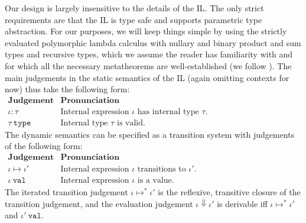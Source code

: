 

Our design is largely insensitive to the details of the IL. The only strict requirements are that the IL is type safe and supports parametric type abstraction. For our purposes, we will keep things simple by using the strictly evaluated polymorphic lambda calculus with nullary and binary product and sum types and recursive types, which we assume the reader has familiarity with and for which all the necessary metatheorems are well-established (we follow \cite{pfpl}). The main judgements in the static semantics of the IL (again omitting contexts for now) thus take the following form:
\\[1ex]
$
\begin{array}{ll}
\textbf{Judgement} & \textbf{Pronunciation}\\
\iota : \tau & \text{Internal expression $\iota$ has internal type $\tau$.}\\
\tau~\mathtt{type} & \text{Internal type $\tau$ is valid.}
\end{array}
$\\

\noindent
The dynamic semantics can be specified as a transition system with  judgements of the following form:
\\[1ex]
$
\begin{array}{ll}
\textbf{Judgement} & \textbf{Pronunciation}\\
\iota \mapsto \iota' & \text{Internal expression $\iota$ transitions to $\iota'$.}\\
\iota~\mathtt{val} & \text{Internal expression $\iota$ is a value.}
\end{array}
$
\\[1ex]
The iterated transition judgement $\iota \mapsto^{*} \iota'$ is the reflexive, transitive closure of the transition judgement, and the evaluation judgement $\iota \Downarrow \iota'$ is derivable iff $\iota \mapsto^{*} \iota'$ and $\iota'~\mathtt{val}$.

